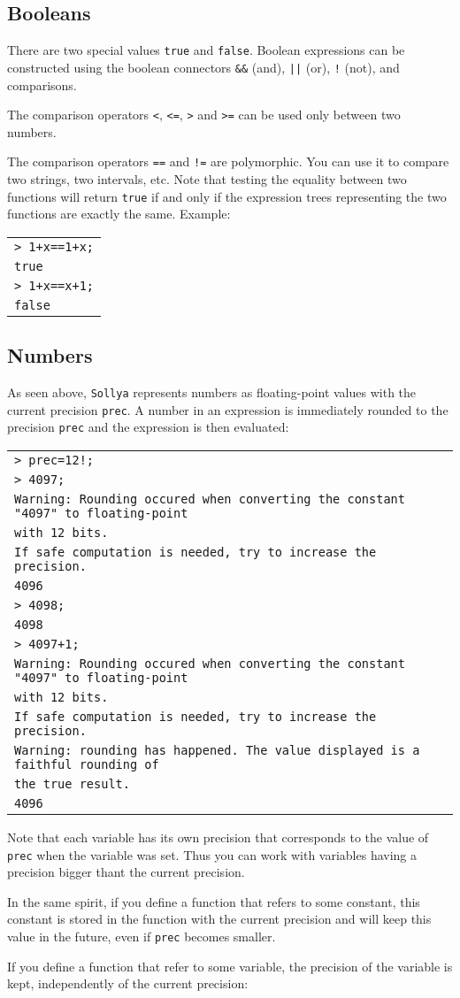 \documentclass[a4paper]{article}
\newcommand{\com}[1]{\texttt{#1}}
\newcommand{\key}[1]{\texttt{#1}}
\newcommand{\sollya}{\texttt{Sollya}\xspace}
\newcommand{\code}[1]{
\begin{center}
\begin{tabular}{|p{14.8cm}|}
\hline
#1
\hline
\end{tabular}
\end{center}
}
\newcommand{\ligne}[1]{\texttt{#1}\\}
\begin{document}
\subsection{Booleans}
There are two special values \key{true} and \key{false}. Boolean expressions can be constructed using the boolean connectors \key{\&\&} (and), \key{||} (or), \key{!} (not), and comparisons.

The comparison operators \key{<}, \key{<=}, \key{>} and \key{>=} can be used only between two numbers.

The comparison operators \key{==} and \key{!=} are polymorphic. You can use it to compare two strings, two intervals, etc. Note that testing the equality between two functions will return \key{true} if and only if the expression trees representing the two functions are exactly the same. Example:

\code{
\ligne{> 1+x==1+x;}
\ligne{true}
\ligne{> 1+x==x+1;}
\ligne{false}
}

\subsection{Numbers}
As seen above, \sollya represents numbers as floating-point values with the current precision \com{prec}. A number in an expression is immediately rounded to the precision \com{prec} and the expression is then evaluated:

\code{
\ligne{> prec=12!;}
\ligne{> 4097;}
\ligne{Warning: Rounding occured when converting the constant "4097" to floating-point}
\ligne{with 12 bits.}
\ligne{If safe computation is needed, try to increase the precision.}
\ligne{4096}
\ligne{> 4098;}
\ligne{4098}
\ligne{> 4097+1;}
\ligne{Warning: Rounding occured when converting the constant "4097" to floating-point}
\ligne{with 12 bits.}
\ligne{If safe computation is needed, try to increase the precision.}
\ligne{Warning: rounding has happened. The value displayed is a faithful rounding of}
\ligne{the true result.}
\ligne{4096}
}

Note that each variable has its own precision that corresponds to the value of \com{prec} when the variable was set. Thus you can work with variables having a precision bigger thant the current precision.

In the same spirit, if you define a function that refers to some constant, this constant is stored in the function with the current precision and will keep this value in the future, even if \com{prec} becomes smaller.

If you define a function that refer to some variable, the precision of the variable is kept, independently of the current precision:
\end{document}
